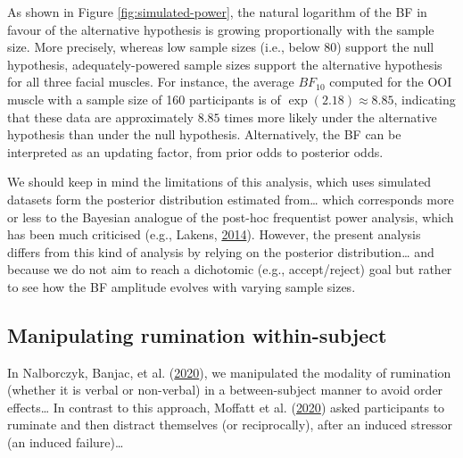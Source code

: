 \documentclass[
  english,
  man,floatsintext]{apa6}
\begin{document}
As shown in Figure \ref{fig:simulated-power}, the natural logarithm of the BF in favour of the alternative hypothesis is growing proportionally with the sample size. More precisely, whereas low sample sizes (i.e., below 80) support the null hypothesis, adequately-powered sample sizes support the alternative hypothesis for all three facial muscles. For instance, the average \(BF_{10}\) computed for the OOI muscle with a sample size of 160 participants is of \(\exp(2.18) \approx 8.85\), indicating that these data are approximately \(8.85\) times more likely under the alternative hypothesis than under the null hypothesis. Alternatively, the BF can be interpreted as an updating factor, from prior odds to posterior odds.

We should keep in mind the limitations of this analysis, which uses simulated datasets form the posterior distribution estimated from\ldots{} which corresponds more or less to the Bayesian analogue of the post-hoc frequentist power analysis, which has been much criticised (e.g., Lakens, \protect\hyperlink{ref-lakens_20_2014}{2014}). However, the present analysis differs from this kind of analysis by relying on the posterior distribution\ldots{} and because we do not aim to reach a dichotomic (e.g., accept/reject) goal but rather to see how the BF amplitude evolves with varying sample sizes.

\hypertarget{manipulating-rumination-within-subject}{%
\subsection{Manipulating rumination within-subject}\label{manipulating-rumination-within-subject}}

In Nalborczyk, Banjac, et al. (\protect\hyperlink{ref-nalborczyk_dissociating_2020}{2020}), we manipulated the modality of rumination (whether it is verbal or non-verbal) in a between-subject manner to avoid order effects\ldots{} In contrast to this approach, Moffatt et al. (\protect\hyperlink{ref-moffatt_inner_2020}{2020}) asked participants to ruminate and then distract themselves (or reciprocally), after an induced stressor (an induced failure)\ldots{}
\end{document}
